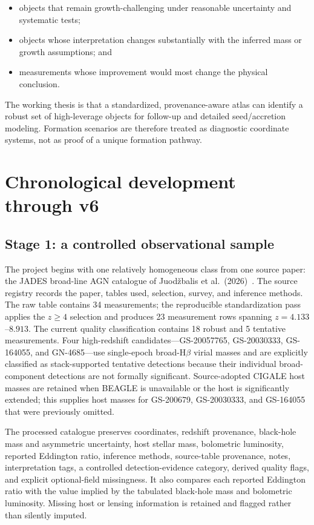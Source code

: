 \documentclass[11pt]{article}
\begin{document}
\begin{itemize}
  \item objects that remain growth-challenging under reasonable uncertainty and systematic tests;
  \item objects whose interpretation changes substantially with the inferred mass or growth assumptions; and
  \item measurements whose improvement would most change the physical conclusion.
\end{itemize}

The working thesis is that a standardized, provenance-aware atlas can identify a robust set of high-leverage objects for follow-up and detailed seed/accretion modeling. Formation scenarios are therefore treated as diagnostic coordinate systems, not as proof of a unique formation pathway.

\section{Chronological development through v6}

\subsection{Stage 1: a controlled observational sample}

The project begins with one relatively homogeneous class from one source paper: the JADES broad-line AGN catalogue of Juod\v{z}balis et al.\ (2026)~\cite{juodzbalis2026}. The source registry records the paper, tables used, selection, survey, and inference methods. The raw table contains 34 measurements; the reproducible standardization pass applies the $z\geq4$ selection and produces 23 measurement rows spanning $z=4.133$--$8.913$. The current quality classification contains 18 robust and 5 tentative measurements. Four high-redshift candidates---GS-20057765, GS-20030333, GS-164055, and GN-4685---use single-epoch broad-H$\beta$ virial masses and are explicitly classified as stack-supported tentative detections because their individual broad-component detections are not formally significant. Source-adopted CIGALE host masses are retained when BEAGLE is unavailable or the host is significantly extended; this supplies host masses for GS-200679, GS-20030333, and GS-164055 that were previously omitted.

The processed catalogue preserves coordinates, redshift provenance, black-hole mass and asymmetric uncertainty, host stellar mass, bolometric luminosity, reported Eddington ratio, inference methods, source-table provenance, notes, interpretation tags, a controlled detection-evidence category, derived quality flags, and explicit optional-field missingness. It also compares each reported Eddington ratio with the value implied by the tabulated black-hole mass and bolometric luminosity. Missing host or lensing information is retained and flagged rather than silently imputed.
\end{document}
